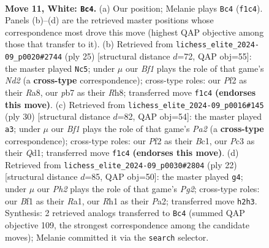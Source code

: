\documentclass[11pt]{article}
\begin{document}
\clearpage

\begin{figure}[p]\centering
\begin{subfigure}{0.46\textwidth}\centering
\resizebox{\linewidth}{!}{%
\newchessgame
\chessboard[
  setfen={rnb1r1k1/pp2ppbp/3q2p1/2pP2B1/4P3/2P5/P2K1PPP/R1Q2BNR w - - 3 11},
  showmover=false,
  pgfstyle=straightmove, color=movearrow, markmove={f1-c4}
]}
\caption{}
\end{subfigure}\hfill
\begin{subfigure}{0.46\textwidth}\centering
\resizebox{\linewidth}{!}{%
\newchessgame
\chessboard[
  setfen={r2qk2r/pp1n1pp1/2pb2b1/3p2Pp/Q4P2/3P4/PP2P1BP/RNB2RK1 b kq - 0 13},
  showmover=false,
  pgfstyle=straightmove, color=movearrow, markmove={d7-c5}
]}
\caption{}
\end{subfigure}
\\[4pt]
\begin{subfigure}{0.46\textwidth}\centering
\resizebox{\linewidth}{!}{%
\newchessgame
\chessboard[
  setfen={r1b2rk1/ppp2ppp/2n2q2/3p3B/1b2pP2/4P3/PP1P2PP/1RBQ1RK1 w - - 5 16},
  showmover=false,
  pgfstyle=straightmove, color=movearrow, markmove={a2-a3}
]}
\caption{}
\end{subfigure}\hfill
\begin{subfigure}{0.46\textwidth}\centering
\resizebox{\linewidth}{!}{%
\newchessgame
\chessboard[
  setfen={rn3rk1/ppp2pp1/4p2p/4Pbq1/4p3/1P2P2P/PBPN1PP1/R2QK2R w KQ - 1 12},
  showmover=false,
  pgfstyle=straightmove, color=movearrow, markmove={g2-g4}
]}
\caption{}
\end{subfigure}
\caption{\textbf{Move 11, White: \texttt{Bc4}.} (a) Our position; Melanie plays \texttt{Bc4} (\texttt{f1c4}). Panels (b)--(d) are the retrieved master positions whose correspondence most drove this move (highest QAP objective among those that transfer to it). (b) Retrieved from \texttt{lichess\_elite\_2024-09\_p0020\#2744} (ply 25) [structural distance $d$=72, QAP obj=55]: the master played \texttt{Nc5}; under $\mu$ our \emph{Bf1} plays the role of that game's \emph{Nd2} (a \textbf{cross-type} correspondence); cross-type roles: our \emph{P}f2 as their \emph{R}a8, our \emph{p}b7 as their \emph{R}h8; transferred move \texttt{f1c4} \textbf{(endorses this move)}. (c) Retrieved from \texttt{lichess\_elite\_2024-09\_p0016\#145} (ply 30) [structural distance $d$=82, QAP obj=54]: the master played \texttt{a3}; under $\mu$ our \emph{Bf1} plays the role of that game's \emph{Pa2} (a \textbf{cross-type} correspondence); cross-type roles: our \emph{P}f2 as their \emph{B}c1, our \emph{P}c3 as their \emph{Q}d1; transferred move \texttt{f1c4} \textbf{(endorses this move)}. (d) Retrieved from \texttt{lichess\_elite\_2024-09\_p0030\#2804} (ply 22) [structural distance $d$=85, QAP obj=50]: the master played \texttt{g4}; under $\mu$ our \emph{Ph2} plays the role of that game's \emph{Pg2}; cross-type roles: our \emph{B}f1 as their \emph{R}a1, our \emph{R}h1 as their \emph{P}a2; transferred move \texttt{h2h3}. Synthesis: 2 retrieved analogs transferred to \texttt{Bc4} (summed QAP objective 109, the strongest correspondence among the candidate moves); Melanie committed it via the \texttt{search} selector.}
\label{fig:thought-m20}
\end{figure}
\end{document}
